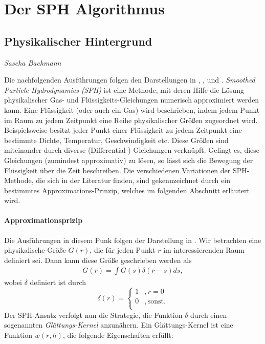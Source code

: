 
\chapter{Der SPH Algorithmus}
\thispagestyle{empty}

\section{Physikalischer Hintergrund}

\begin{center}
\emph{{\small Sascha Bachmann}}
\end{center}

\bigskip

\noindent Die nachfolgenden Ausführungen folgen den Darstellungen in \cite{IntroSPH}, \cite{FlowSPH}, \cite{FluidSim} und \cite{BoundarySPH}. \emph{Smoothed Particle Hydrodynamics (SPH)} ist eine Methode, mit deren Hilfe die Lösung physikalischer Gas- und Flüssigkeits-Gleichungen numerisch approximiert werden kann. Eine Flüssigkeit (oder auch ein Gas) wird beschrieben, indem jedem Punkt im Raum zu jedem Zeitpunkt eine Reihe physikalischer Größen zugeordnet wird. Beispielsweise besitzt jeder Punkt einer Flüssigkeit zu jedem Zeitpunkt eine bestimmte Dichte, Temperatur, Geschwindigkeit etc. Diese Größen sind miteinander durch diverse (Differential-) Gleichungen verknüpft. Gelingt es, diese Gleichungen (zumindest approximativ) zu lösen, so lässt sich die Bewegung der Flüssigkeit über die Zeit beschreiben. Die verschiedenen Variationen der SPH-Methode, die sich in der Literatur finden, sind gekennzeichnet durch ein bestimmtes Approximations-Prinzip, welches im folgenden Abschnitt erläutert wird.
\medskip

\subsubsection*{Approximationsprizip} Die Ausführungen in diesem Punk folgen der Darstellung in \cite[S. 89 f]{IntroSPH}. Wir betrachten eine physikalische Größe $G(r)$, die für jeden Punkt $r$ im interessierenden Raum definiert sei. Dann kann diese Größe geschrieben werden als
\begin{align}\label{eqn1}
G(r) = \int G(s)\delta(r - s) ds,
\end{align}
wobei $\delta$ definiert ist durch
\[
\delta(r) = \begin{cases}
1 & , r = 0 \\
0 & , \text{sonst}.\\
\end{cases}
\]
Der SPH-Ansatz verfolgt nun die Strategie, die Funktion $\delta$ durch einen sogenannten \emph{Glättungs-Kernel} anzunähern. Ein Glättungs-Kernel ist eine Funktion $w(r, h)$, die folgende Eigenschaften erfüllt:

